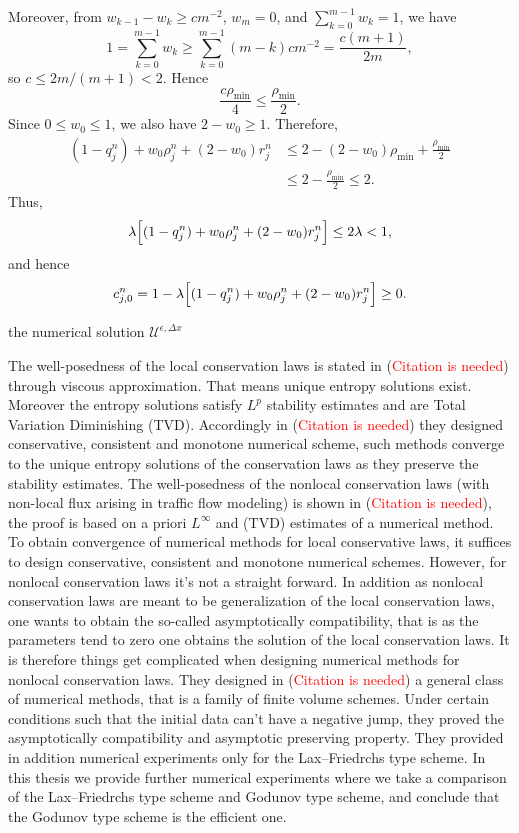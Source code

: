 Moreover, from \(w_{k-1}-w_k\ge cm^{-2}\), \(w_m=0\), and \(\sum_{k=0}^{m-1}w_k=1\), we have
\[
    1=\sum_{k=0}^{m-1}w_k
    \ge
    \sum_{k=0}^{m-1}(m-k)cm^{-2}
    =
    \frac{c(m+1)}{2m},
\]
so \(c\le 2m/(m+1)<2\). Hence
\[
    \frac{c\rho_{\min}}{4}\le \frac{\rho_{\min}}{2}.
\]
Since \(0\le w_0\le1\), we also have \(2-w_0\ge1\). Therefore,
\[
    \begin{aligned}
        (1-q_j^n)+w_0\rho_j^n+(2-w_0)r_j^n
         & \le
        2-(2-w_0)\rho_{\min}
        +\frac{\rho_{\min}}{2} \\
         & \le
        2-\frac{\rho_{\min}}{2}
        \le 2.
    \end{aligned}
\]
Thus,
\[
    \lambda\Bigl[(1-q_j^n)+w_0\rho_j^n+(2-w_0)r_j^n\Bigr]
    \le 2\lambda <1,
\]
and hence
\[
    c_{j,0}^n
    =
    1-\lambda\Bigl[(1-q_j^n)+w_0\rho_j^n+(2-w_0)r_j^n\Bigr]
    \ge 0 .
\]





the numerical solution $\mathcal{U}^{\epsilon, \Delta x}$


The well-posedness of the local conservation laws is stated in (\textcolor{red}{Citation is needed}) through viscous approximation. That means unique entropy solutions exist. Moreover the entropy solutions satisfy $L^p$ stability estimates and are Total Variation Diminishing (TVD). Accordingly in  (\textcolor{red}{Citation is needed}) they designed conservative, consistent and monotone numerical scheme, such methods converge to the unique entropy solutions of the conservation laws as they preserve the stability estimates. The well-posedness of the nonlocal conservation laws (with non-local flux arising in traffic flow modeling) is shown in (\textcolor{red}{Citation is needed}), the proof is based on a priori $L^{\infty}$ and (TVD) estimates of a numerical method.
To obtain convergence of numerical methods for local conservative laws, it suffices to design conservative, consistent and monotone numerical schemes. However, for nonlocal conservation laws it's not a straight forward. In addition as nonlocal conservation laws are meant to be generalization of the local conservation laws, one wants to obtain the so-called asymptotically compatibility, that is as the parameters tend to zero one obtains the solution of the local conservation laws. It is therefore things get complicated when designing numerical methods for nonlocal conservation laws.
They designed in (\textcolor{red}{Citation is needed}) a general class of numerical methods, that is a family of finite volume schemes. Under certain conditions such that the initial data can't have a negative jump, they proved the asymptotically compatibility and asymptotic preserving property. They provided in addition numerical experiments only for the Lax--Friedrchs type scheme. In this thesis we provide further numerical experiments where we take a comparison of the Lax--Friedrchs type scheme and Godunov type scheme, and conclude that the Godunov type scheme is the efficient one.

